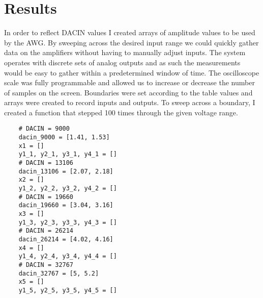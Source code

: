 \section{Results}
\FloatBarrier
In order to reflect DACIN values I created arrays of amplitude values to be used by the AWG. By sweeping across the desired input range we could quickly gather data on the amplifiers without having to manually adjust inputs. The system operates with discrete sets of analog outputs and as such the measurements would be easy to gather within a predetermined window of time. The oscilloscope scale was fully programmable and allowed us to increase or decrease the number of samples on the screen. Boundaries were set according to the table values and arrays were created to record inputs and outputs. To sweep across a boundary, I created a function that stepped 100 times through the given voltage range.
\FloatBarrier
\begin{lstlisting}
	# DACIN = 9000
	dacin_9000 = [1.41, 1.53]
	x1 = []
	y1_1, y2_1, y3_1, y4_1 = []
	# DACIN = 13106
	dacin_13106 = [2.07, 2.18]
	x2 = []
	y1_2, y2_2, y3_2, y4_2 = []
	# DACIN = 19660
	dacin_19660 = [3.04, 3.16]
	x3 = []
	y1_3, y2_3, y3_3, y4_3 = []
	# DACIN = 26214
	dacin_26214 = [4.02, 4.16]
	x4 = []
	y1_4, y2_4, y3_4, y4_4 = []
	# DACIN = 32767
	dacin_32767 = [5, 5.2]
	x5 = []
	y1_5, y2_5, y3_5, y4_5 = []
\end{lstlisting}

